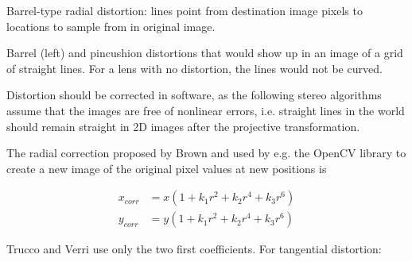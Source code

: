 {Barrel-type radial distortion: lines point from destination image pixels to locations to sample from in original image.}

{Barrel (left) and pincushion distortions that would show up in an image of a grid of straight lines. For a lens with no distortion, the lines would not be curved.}

Distortion should be corrected in software, as the following stereo algorithms assume that the images are free of nonlinear errors, i.e. straight lines in the world should remain straight in 2D images after the projective transformation.

The radial correction proposed by Brown \cite{brown1966decentering} and used by e.g. the OpenCV library to create a new image of the original pixel values at new positions \cite{opencv} is %

\begin{align}
	x_{corr} &= x(1 + k_1 r^2 + k_2 r^4 + k_3 r^6)\\
	y_{corr} &= y(1 + k_1 r^2 + k_2 r^4 + k_3 r^6)
\end{align}



Trucco and Verri \cite{trucco1998introductory} use only the two first coefficients. For tangential distortion:

